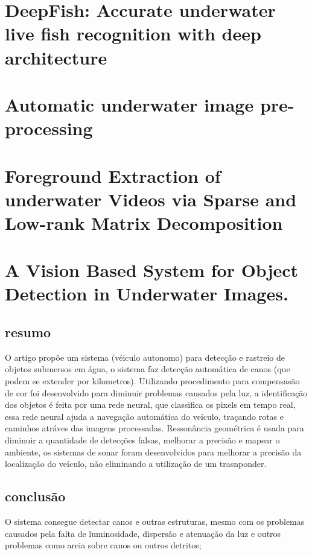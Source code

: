 \label{chap:trab_cor}

\section{DeepFish: Accurate underwater live fish recognition with deep architecture}

\section{Automatic underwater image pre-processing}

\section{Foreground Extraction of underwater Videos via Sparse and Low-rank Matrix Decomposition}

\section{A Vision Based System for Object Detection in Underwater Images.}
\subsection{resumo}
O artigo propõe um sistema (véiculo autonomo) para detecção e rastreio de objetos submersos em água, o sistema faz detecção automática de canos (que podem se extender por kilometros). Utilizando procedimento para compensasão de cor foi desenvolvido para diminuir problemas causados pela luz, a identificação dos objetos é feita por uma rede neural, que classifica os pixels em tempo real, essa rede neural ajuda a navegação automática do veículo, traçando rotas e caminhos atráves das imagens processadas. Ressonância  geométrica é usada para diminuir a quantidade de detecções falsas, melhorar a precisão e mapear o ambiente, os sistemas de sonar foram desenvolvidos para melhorar a precisão da localização do veículo, não eliminando a utilização de um trasnponder.

\subsection{conclusão}
O sistema consegue detectar canos e outras estruturas, mesmo com os problemas causados pela falta de luminosidade, dispersão e atenuação da luz e outros problemas como areia sobre canos ou outros detritos; 